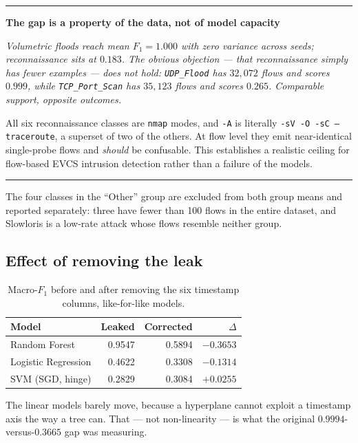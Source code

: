 \documentclass[11pt, a4paper]{article}
\newenvironment{finding}[1]
    {\par\medskip\noindent\textcolor{primary}{\rule{\textwidth}{1pt}}\par\nobreak
     \smallskip\noindent\textbf{\textcolor{primary}{#1}}\par\nobreak\smallskip\itshape}
    {\par\smallskip\noindent\textcolor{primary}{\rule{\textwidth}{1pt}}\par\medskip}
\begin{document}
\begin{finding}{The gap is a property of the data, not of model capacity}
Volumetric floods reach mean $F_1 = 1.000$ with \emph{zero variance across
seeds}; reconnaissance sits at $0.183$. The obvious objection --- that
reconnaissance simply has fewer examples --- does not hold: \texttt{UDP\_Flood}
has $32{,}072$ flows and scores $0.999$, while \texttt{TCP\_Port\_Scan} has
$35{,}123$ flows and scores $0.265$. Comparable support, opposite outcomes.

All six reconnaissance classes are \texttt{nmap} modes, and \texttt{-A} is
literally \texttt{-sV -O -sC --traceroute}, a superset of two of the others. At
flow level they emit near-identical single-probe flows and \emph{should} be
confusable. This establishes a realistic ceiling for flow-based EVCS intrusion
detection rather than a failure of the models.
\end{finding}

\noindent
The four classes in the ``Other'' group are excluded from both group means and
reported separately: three have fewer than 100 flows in the entire dataset, and
Slowloris is a low-rate attack whose flows resemble neither group.

\subsection{Effect of removing the leak}

\begin{table}[h]
\centering
\caption{Macro-$F_1$ before and after removing the six timestamp columns,
         like-for-like models.}
\begin{tabular}{lrrr}
\toprule
\textbf{Model} & \textbf{Leaked} & \textbf{Corrected} & \textbf{$\Delta$} \\
\midrule
Random Forest       & 0.9547 & 0.5894 & $\mathbf{-0.3653}$ \\
Logistic Regression & 0.4622 & 0.3308 & $-0.1314$ \\
SVM (SGD, hinge)    & 0.2829 & 0.3084 & $+0.0255$ \\
\bottomrule
\end{tabular}
\end{table}

\noindent
The linear models barely move, because a hyperplane cannot exploit a timestamp
axis the way a tree can. That --- not non-linearity --- is what the original
$0.9994$-versus-$0.3665$ gap was measuring.

\end{document}
